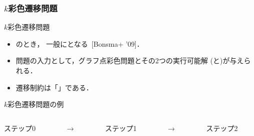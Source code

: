 \documentclass[dvipdfmx,11pt]{beamer}
\begin{document}
\begin{frame}\frametitle{$k$彩色遷移問題}

  \begin{block}{$k$彩色遷移問題}
    \begin{itemize}
      \item {}のとき，
            一般にとなる~[Bonsma+ '09]．
      \item 問題の入力として，グラフ点彩色問題とその2つの実行可能解
            (と)が与えられる．
      \item 遷移制約は「」である．
    \end{itemize}
  \end{block}

  \begin{exampleblock}{$k$彩色遷移問題の例}
    \begin{columns}
      \begin{column}{0.3\textwidth}
        \centering
        
        ステップ0
      \end{column}
      \begin{column}{0.05\textwidth}
        \textbf{$\longrightarrow$}
      \end{column}
      \begin{column}[]{0.3\textwidth}
        \centering
        
        ステップ1
      \end{column}
      \begin{column}{0.05\textwidth}
        \textbf{$\longrightarrow$}
      \end{column}
      \begin{column}{0.3\textwidth}
        \centering
        
        ステップ2
      \end{column}
    \end{columns}
  \end{exampleblock}
  
\end{frame}
\end{document}
